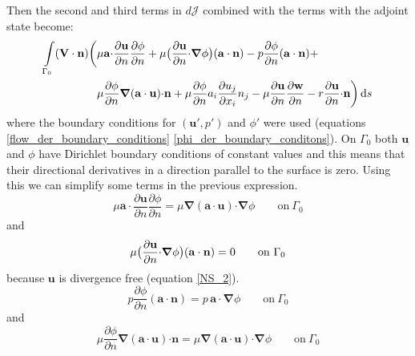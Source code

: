 \documentclass[12pt, a4paper]{article}
\begin{document}
Then the second and third terms in $d \mathcal{J}$ combined with the terms with the adjoint state become:
\begin{equation} \label{cost_change_term_2345_boundary}
\begin{split}
\int\limits_{\Gamma_0} (\mathbf{V \cdot n}) \bigg{(} &
\mu \mathbf{a \cdot} \frac{\partial \mathbf{u}}{\partial n} \frac{\partial \phi}{\partial n} + 
\mu \big{(} \frac{\partial \mathbf{u}}{\partial n} \mathbf{\cdot} \boldsymbol{\nabla} \phi \big{)} 
(\mathbf{a \cdot n}) - 
p \frac{\partial \phi}{\partial n} (\mathbf{a \cdot n}) + \\
&\mu \frac{\partial \phi}{\partial n} \boldsymbol{\nabla} (\mathbf{a \cdot u}) \mathbf{\cdot n} + 
\mu \frac{\partial \phi}{\partial n} a_i \frac{\partial u_j}{\partial x_i} n_j - 
\mu \frac{\partial \mathbf{u}}{\partial n} \frac{\partial \mathbf{w}}{\partial n} - 
r \frac{\partial \mathbf{u}}{\partial n} \mathbf{\cdot n}
\bigg{)} \, \mathrm{d}s
\end{split}
\end{equation}
where the boundary conditions for $(\mathbf{u'},p')$ and $\phi'$ were used (equations \ref{flow_der_boundary_conditions} \ref{phi_der_boundary_conditons}).
On $\Gamma_0$ both $\mathbf{u}$ and $\phi$ have Dirichlet boundary conditions of constant values and this means that their directional derivatives in a direction parallel to the surface is zero. Using this we can simplify some terms in the previous expression.
\begin{equation*}
\mu \mathbf{a \cdot} \frac{\partial \mathbf{u}}{\partial n} \frac{\partial \phi}{\partial n} = 
\mu \boldsymbol{\nabla}(\mathbf{a \cdot u}) \mathbf{\cdot} \boldsymbol{\nabla} \phi
\qquad \text{on} \ \Gamma_0
\end{equation*}
and
\begin{equation*}
\mu \big{(} \frac{\partial \mathbf{u}}{\partial n} \mathbf{\cdot} \boldsymbol{\nabla} \phi \big{)} 
(\mathbf{a \cdot n}) = 0
\qquad \text{on} \ \Gamma_0
\end{equation*}
because $\mathbf{u}$ is divergence free (equation \ref{NS_2}).
\begin{equation*}
p \frac{\partial \phi}{\partial n} (\mathbf{a \cdot n}) = 
p \, \mathbf{a \cdot} \boldsymbol{\nabla} \phi
\qquad \text{on} \ \Gamma_0
\end{equation*}
and
\begin{equation*}
\mu \frac{\partial \phi}{\partial n} \boldsymbol{\nabla} (\mathbf{a \cdot u}) \mathbf{\cdot n} = 
\mu \boldsymbol{\nabla} (\mathbf{a \cdot u}) \mathbf{\cdot} \boldsymbol{\nabla} \phi
\qquad \text{on} \ \Gamma_0
\end{equation*}
\end{document}

